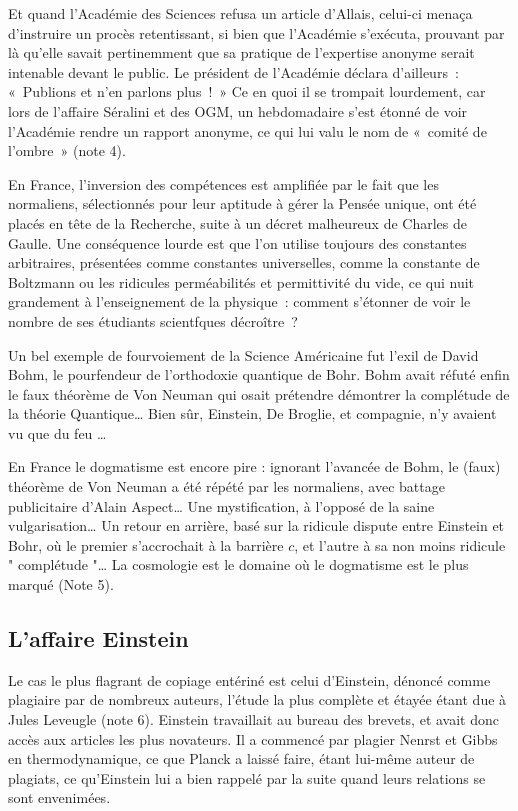 \documentclass[a4paper,12pt]{article}
\begin{document}
Et quand l'Académie des Sciences refusa un article d'Allais, celui-ci menaça d'instruire un procès retentissant, si bien que l'Académie s'exécuta, prouvant par là qu'elle savait pertinemment que sa pratique de l'expertise anonyme serait intenable devant le public. Le président de l'Académie déclara d'ailleurs : « Publions et n'en parlons plus ! » Ce en quoi il se trompait lourdement, car lors de l’affaire Séralini et des OGM, un hebdomadaire s’est étonné de voir l’Académie rendre un rapport anonyme, ce qui lui valu le nom de « comité de l'ombre » (note 4).

En France, l'inversion des compétences est amplifiée par le fait que les normaliens, sélectionnés pour leur aptitude à gérer la Pensée unique, ont été placés en tête de la Recherche, suite à un décret malheureux de Charles de Gaulle. Une conséquence lourde est que l'on utilise toujours des constantes arbitraires, présentées comme constantes universelles, comme la constante de Boltzmann ou les ridicules perméabilités et permittivité du vide, ce qui nuit grandement à l'enseignement de la physique : comment s’étonner de voir le nombre de ses étudiants scientfques décroître ?

Un bel exemple de fourvoiement de la Science Américaine fut l’exil de David Bohm, le pourfendeur de l’orthodoxie quantique de Bohr. Bohm avait réfuté enfin le faux théorème de Von Neuman qui osait prétendre démontrer la complétude de la théorie Quantique… Bien sûr, Einstein, De Broglie, et compagnie, n’y avaient vu que du feu … 


En France le dogmatisme est encore pire : ignorant l’avancée de Bohm, le (faux) théorème de Von Neuman a été répété par les normaliens,  avec battage publicitaire d’Alain Aspect… Une mystification, à l’opposé de la saine vulgarisation… Un retour en arrière, basé sur la ridicule dispute entre Einstein et Bohr, où le premier s’accrochait à la barrière $c$, et l’autre à sa non moins ridicule " complétude "… La cosmologie est le domaine où le dogmatisme est le plus marqué (Note 5).







\subsection {L'affaire Einstein}

 Le cas le plus flagrant de copiage entériné est celui d’Einstein, dénoncé comme plagiaire par de nombreux auteurs, l’étude la plus complète et étayée étant due à Jules Leveugle (note 6). Einstein travaillait au bureau des brevets, et avait donc accès aux articles les plus novateurs. Il a commencé par plagier Nenrst et Gibbs en thermodynamique, ce que Planck a laissé faire, étant lui-même auteur de plagiats, ce qu’Einstein lui a bien rappelé par la suite quand leurs relations se sont envenimées.
\end{document}
